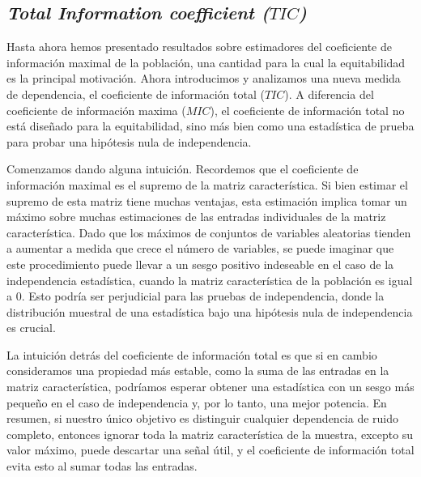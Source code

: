     
        \subsection[TIC]{\textit{Total Information coefficient ($TIC$)}}
    
        Hasta ahora hemos presentado resultados sobre estimadores del coeficiente de informaci\'on maximal de la poblaci\'on, una cantidad para la cual la equitabilidad es la principal motivaci\'on. Ahora introducimos y analizamos una nueva medida de dependencia, el coeficiente de informaci\'on total ($TIC$). A diferencia del coeficiente de informaci\'on maxima ($MIC$), el coeficiente de informaci\'on total no est\'a dise\~nado para la equitabilidad, sino m\'as bien como una estad\'istica de prueba para probar una hip\'otesis nula de independencia.
    
        Comenzamos dando alguna intuici\'on. Recordemos que el coeficiente de informaci\'on maximal es el supremo de la matriz caracter\'istica. Si bien estimar el supremo de esta matriz tiene muchas ventajas, esta estimaci\'on implica tomar un m\'aximo sobre muchas estimaciones de las entradas individuales de la matriz caracter\'istica. Dado que los m\'aximos de conjuntos de variables aleatorias tienden a aumentar a medida que crece el n\'umero de variables, se puede imaginar que este procedimiento puede llevar a un sesgo positivo indeseable en el caso de la independencia estad\'istica, cuando la matriz caracter\'istica de la poblaci\'on es igual a 0. Esto podr\'ia ser perjudicial para las pruebas de independencia, donde la distribuci\'on muestral de una estad\'istica bajo una hip\'otesis nula de independencia es crucial.
        
        La intuici\'on detr\'as del coeficiente de informaci\'on total es que si en cambio consideramos una propiedad m\'as estable, como la suma de las entradas en la matriz caracter\'istica, podr\'iamos esperar obtener una estad\'istica con un sesgo m\'as peque\~no en el caso de independencia y, por lo tanto, una mejor potencia. En resumen, si nuestro \'unico objetivo es distinguir cualquier dependencia de ruido completo, entonces ignorar toda la matriz caracter\'istica de la muestra, excepto su valor m\'aximo, puede descartar una se\~nal \'util, y el coeficiente de informaci\'on total evita esto al sumar todas las entradas.
        
